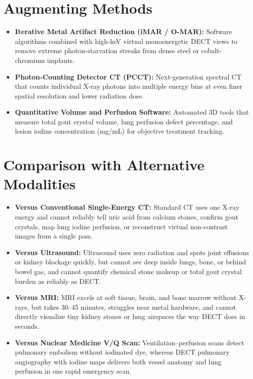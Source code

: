 \section{Augmenting Methods}
\begin{itemize}
\item \textbf{Iterative Metal Artifact Reduction (iMAR / O-MAR):} Software algorithms combined with high-keV virtual monoenergetic DECT views to remove extreme photon-starvation streaks from dense steel or cobalt-chromium implants.
\item \textbf{Photon-Counting Detector CT (PCCT):} Next-generation spectral CT that counts individual X-ray photons into multiple energy bins at even finer spatial resolution and lower radiation dose.
\item \textbf{Quantitative Volume and Perfusion Software:} Automated 3D tools that measure total gout crystal volume, lung perfusion defect percentage, and lesion iodine concentration (mg/mL) for objective treatment tracking.
\end{itemize}

\section{Comparison with Alternative Modalities}
\begin{itemize}
\item \textbf{Versus Conventional Single-Energy CT:} Standard CT uses one X-ray energy and cannot reliably tell uric acid from calcium stones, confirm gout crystals, map lung iodine perfusion, or reconstruct virtual non-contrast images from a single pass.
\item \textbf{Versus Ultrasound:} Ultrasound uses zero radiation and spots joint effusions or kidney blockage quickly, but cannot see deep inside lungs, bone, or behind bowel gas, and cannot quantify chemical stone makeup or total gout crystal burden as reliably as DECT.
\item \textbf{Versus MRI:} MRI excels at soft tissue, brain, and bone marrow without X-rays, but takes 30--45 minutes, struggles near metal hardware, and cannot directly visualize tiny kidney stones or lung airspaces the way DECT does in seconds.
\item \textbf{Versus Nuclear Medicine V/Q Scan:} Ventilation--perfusion scans detect pulmonary embolism without iodinated dye, whereas DECT pulmonary angiography with iodine maps delivers both vessel anatomy and lung perfusion in one rapid emergency scan.
\end{itemize}

